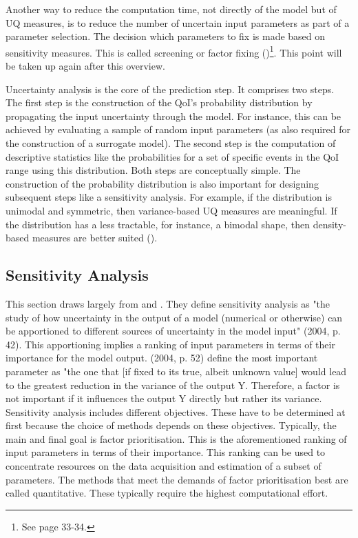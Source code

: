 \documentclass[a4paper,12pt]{article}
\begin{document}
Another way to reduce the computation time, not directly of the model but of UQ measures, is to reduce the number of uncertain input parameters as part of a parameter selection. The decision which parameters to fix is made based on sensitivity measures. This is called screening or factor fixing (\cite{Saltelli.2008})\footnote{See page 33-34.}. This point will be taken up again after this overview.

Uncertainty analysis is the core of the prediction step. It comprises two steps. The first step is the construction of the QoI's probability distribution by propagating the input uncertainty through the model. For instance, this can be achieved by evaluating a sample of random input parameters (as also required for the construction of a surrogate model). The second step is the computation of descriptive statistics like the probabilities for a set of specific events in the QoI range using this distribution. Both steps are conceptually simple. The construction of the probability distribution is also important for designing subsequent steps like a sensitivity analysis. For example, if the distribution is unimodal and symmetric, then variance-based UQ measures are meaningful. If the distribution has a less tractable, for instance, a bimodal shape, then density-based measures are better suited (\cite{plischke2013global}).


\subsection{Sensitivity Analysis}


This section draws largely from \cite{Saltelli.2004} and \cite{Saltelli.2008}.
They define sensitivity analysis as "the study of how uncertainty in the output of a model (numerical or otherwise) can be apportioned to different sources of uncertainty in the model input" \citeauthor{Saltelli.2004} (2004, p. 42). This apportioning implies a ranking of input parameters in terms of their importance for the model output. \citeauthor{Saltelli.2004} (2004, p. 52) define the most important parameter as "the one that [if fixed to its true, albeit unknown value]
would lead to the greatest reduction in the variance of the output Y. Therefore, a factor is not important if it influences the output Y directly but rather its variance.\\

\noindent
Sensitivity analysis includes different objectives. These have to be determined at first because the choice of methods depends on these objectives. Typically, the main and final goal is factor prioritisation. This is the aforementioned ranking of input parameters in terms of their importance. This ranking can be used to concentrate resources on the data acquisition and estimation of a subset of parameters. The methods that meet the demands of factor prioritisation best are called quantitative. These typically require the highest computational effort.
\end{document}
